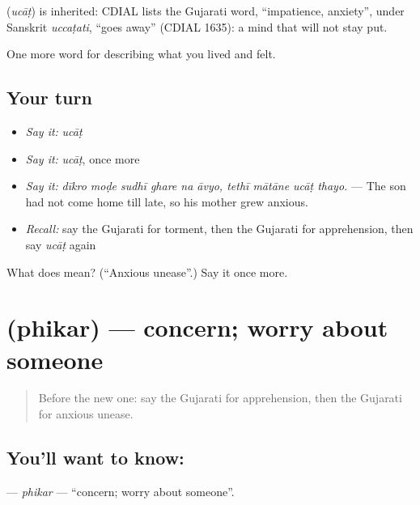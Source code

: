 \begin{cousinweb}
\textbf{} (\emph{ucāṭ}) is inherited: CDIAL lists the Gujarati word, \textquotedblleft{}impatience, anxiety\textquotedblright{}, under Sanskrit \emph{uccaṭati}, \textquotedblleft{}goes away\textquotedblright{} (CDIAL 1635): a mind that will not stay put.
\end{cousinweb}

\begin{grammarlens}[title={What you've built}]
One more word for describing what you lived and felt.
\end{grammarlens}

\subsection*{Your turn}
\begin{itemize}
\raggedright
  \item \emph{Say it:} \emph{ucāṭ}
  \item \emph{Say it:} \emph{ucāṭ}, once more
  \item \emph{Say it:} \emph{dīkro moḍe sudhī ghare na āvyo, tethī mātāne ucāṭ thayo.} — The son had not come home till late, so his mother grew anxious.
  \item \emph{Recall:} say the Gujarati for torment, then the Gujarati for apprehension, then say \emph{ucāṭ} again
\end{itemize}

\begin{tcolorbox}[breakable,colback=teal!4,colframe=teal!35!black,title={Before you move on}]
What does  mean? (\textquotedblleft{}Anxious unease\textquotedblright{}.) Say it once more.
\end{tcolorbox}
\section[\texorpdfstring{\gu{ફિકર} (phikar)}{ફિકર (phikar)}]{ (phikar) — concern; worry about someone}

\label{lesson:GU-C454-phikar}



\begin{quote}
Before the new one: say the Gujarati for apprehension, then the Gujarati for anxious unease.
\end{quote}

\subsection*{You'll want to know: }
\textbf{} — \emph{phikar} — \textquotedblleft{}concern; worry about someone\textquotedblright{}.

